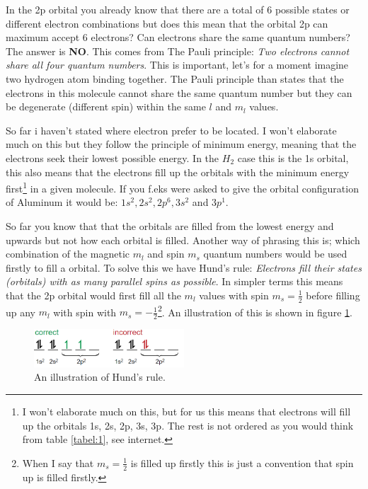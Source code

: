 \documentclass[jmp, amsmath, amssymb, reprint]{article}
\numberwithin{equation}{section}
\begin{document}
\begin{multicols}{2}
In the 2p orbital you already know that there are a total of 6 possible states or different electron combinations but does this mean that the orbital 2p can maximum accept 6 electrons? Can electrons share the same quantum numbers? The answer is \textbf{NO}. This comes from The Pauli principle: \textit{Two electrons cannot share all four quantum numbers}. This is important, let's for a moment imagine two hydrogen atom binding together. The Pauli principle than states that the electrons in this molecule cannot share the same quantum number but they can be degenerate (different spin) within the same \(l\) and \(m_l\) values. 

So far i haven't stated where electron prefer to be located. I won't elaborate much on this but they follow the principle of minimum energy, meaning that the electrons seek their lowest possible energy. In the \(H_2\) case this is the 1s orbital, this also means that the electrons fill up the orbitals with the minimum energy first\footnote{I won't elaborate much on this, but for us this means that electrons will fill up the orbitals 1s, 2s, 2p, 3s, 3p. The rest is not ordered as you would think from table \ref{tabel:1}, see internet.} in a given molecule. If you f.eks were asked to give the orbital configuration of Aluminum it would be: \(1s^2, 2s^2, 2p^6, 3s^2\) and \(3p^1\).

So far you know that that the orbitals are filled from the lowest energy and upwards but not how each orbital is filled. Another way of phrasing this is; which combination of the magnetic $m_l$ and spin $m_s$ quantum numbers would be used firstly to fill a orbital. To solve this we have Hund's rule: \textit{Electrons fill their states (orbitals) with as many parallel spins as possible}. In simpler terms this means that the 2p orbital would first fill all the $m_l$ values with spin \(m_s=\frac{1}{2}\) before filling up any \(m_l\) with spin with \(m_s=-\frac{1}{2}\)\footnote{When I say that \(m_s=\frac{1}{2}\) is filled up firstly this is just a convention that spin up is filled firstly.}. An illustration of this is shown in figure \ref{fig:orbitals}.

\begin{figure}[H]
	\centering
  	\includegraphics[width=0.50\textwidth]{hunds_rule.png}
	\caption{An illustration of Hund's rule.}%
	\label{fig:orbitals}
\end{figure}


\end{multicols}
\end{document}

